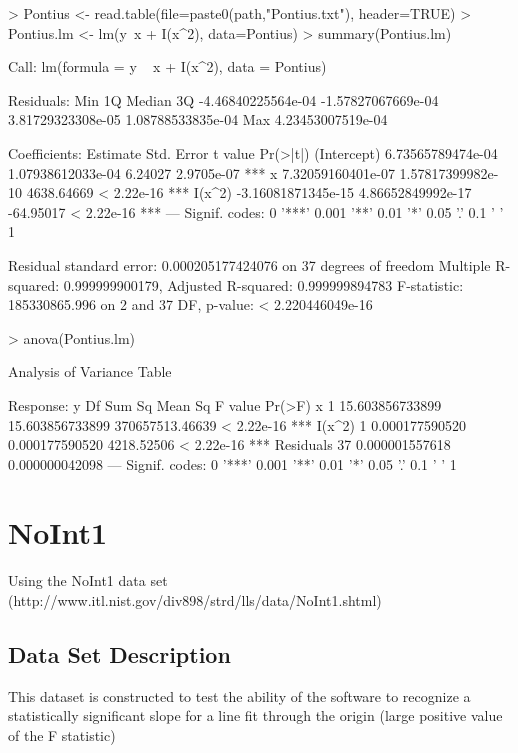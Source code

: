 \documentclass[10pt]{article}
\begin{document}
\begin{Schunk}
\begin{Sinput}
> Pontius <- read.table(file=paste0(path,"Pontius.txt"), header=TRUE)
> Pontius.lm <- lm(y~x + I(x^2), data=Pontius)
> summary(Pontius.lm)
\end{Sinput}
\begin{Soutput}
Call:
lm(formula = y ~ x + I(x^2), data = Pontius)

Residuals:
               Min                 1Q             Median                 3Q 
-4.46840225564e-04 -1.57827067669e-04  3.81729323308e-05  1.08788533835e-04 
               Max 
 4.23453007519e-04 

Coefficients:
                      Estimate         Std. Error    t value   Pr(>|t|)    
(Intercept)  6.73565789474e-04  1.07938612033e-04    6.24027 2.9705e-07 ***
x            7.32059160401e-07  1.57817399982e-10 4638.64669 < 2.22e-16 ***
I(x^2)      -3.16081871345e-15  4.86652849992e-17  -64.95017 < 2.22e-16 ***
---
Signif. codes:  0 '***' 0.001 '**' 0.01 '*' 0.05 '.' 0.1 ' ' 1

Residual standard error: 0.000205177424076 on 37 degrees of freedom
Multiple R-squared:  0.999999900179,	Adjusted R-squared:  0.999999894783 
F-statistic: 185330865.996 on 2 and 37 DF,  p-value: < 2.220446049e-16
\end{Soutput}
\begin{Sinput}
> anova(Pontius.lm)
\end{Sinput}
\begin{Soutput}
Analysis of Variance Table

Response: y
          Df          Sum Sq         Mean Sq         F value     Pr(>F)    
x          1 15.603856733899 15.603856733899 370657513.46639 < 2.22e-16 ***
I(x^2)     1  0.000177590520  0.000177590520      4218.52506 < 2.22e-16 ***
Residuals 37  0.000001557618  0.000000042098                               
---
Signif. codes:  0 '***' 0.001 '**' 0.01 '*' 0.05 '.' 0.1 ' ' 1
\end{Soutput}
\end{Schunk}

\section{NoInt1}
Using the NoInt1 data set (http://www.itl.nist.gov/div898/strd/lls/data/NoInt1.shtml)

\subsection*{Data Set Description}
This dataset is constructed to test the ability of the software to recognize a 
statistically significant slope for a line fit through the origin (large positive 
value of the F statistic)
\end{document}
